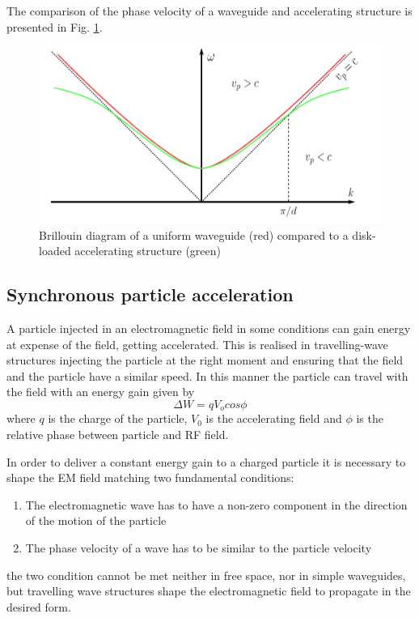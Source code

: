 The comparison of the phase velocity of a waveguide and accelerating structure is presented in Fig. \ref{vp_fig}.



\begin{figure}[h]
\centering

\includegraphics[scale=0.4]{pictures/vp}
\caption{Brillouin diagram of a uniform waveguide (red) compared to a disk-loaded accelerating structure (green) \cite{Kovermann:1330346}}
\label{vp_fig}

\end{figure}




\subsection[Synchronous particle acceleration]{Synchronous particle acceleration}

A particle injected in an electromagnetic field in some conditions can gain energy at expense of the field, getting accelerated. This is realised in travelling-wave structures injecting the particle at the right moment and ensuring that the field and the particle have a similar speed. In this manner the particle can travel with the field with an energy gain given by
\begin{equation}
\Delta W = q V_o cos \phi
\end{equation}
where $q$ is the charge of the particle, $V_0$ is the accelerating field and $\phi$ is the relative phase between particle and RF field.

In order to deliver a  constant energy gain to a charged particle it is necessary to shape the EM field matching  two fundamental conditions:

\begin{enumerate}
\item The electromagnetic wave has to have a non-zero component in the direction of the motion of the particle
\item The phase velocity of a wave has to be similar to the particle velocity
\end{enumerate}
the two condition cannot be met neither in free space, nor in simple waveguides, but travelling wave structures shape the electromagnetic field to propagate in the desired form.



